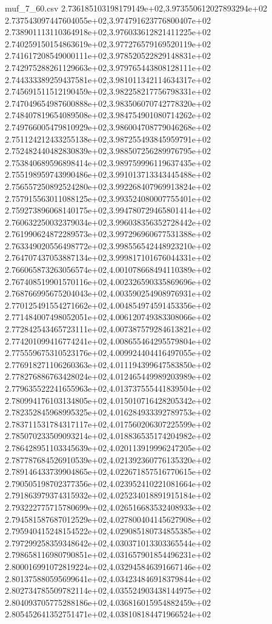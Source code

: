 \begin{filecontents*}{muf_7_60.csv}
2.736185103198179149e+02,3.973550612027893294e+02
2.737543097447604055e+02,3.974791623776800407e+02
2.738901113110364918e+02,3.976033612821411225e+02
2.740259150154863619e+02,3.977276579169520119e+02
2.741617208549000111e+02,3.978520522829148831e+02
2.742975288261129663e+02,3.979765443808128111e+02
2.744333389259437581e+02,3.981011342114634317e+02
2.745691511512190459e+02,3.982258217756798331e+02
2.747049654987600888e+02,3.983506070742778320e+02
2.748407819654089508e+02,3.984754901080714262e+02
2.749766005479810929e+02,3.986004708779046268e+02
2.751124212433255138e+02,3.987255493845959791e+02
2.752482440482830839e+02,3.988507256289976795e+02
2.753840689596898414e+02,3.989759996119637435e+02
2.755198959743990486e+02,3.991013713343445488e+02
2.756557250892524280e+02,3.992268407969913824e+02
2.757915563011088125e+02,3.993524080007755401e+02
2.759273896068140175e+02,3.994780729465801414e+02
2.760632250032379034e+02,3.996038356352728442e+02
2.761990624872289573e+02,3.997296960677531388e+02
2.763349020556498772e+02,3.998556542448923210e+02
2.764707437053887134e+02,3.999817101676044331e+02
2.766065873263056574e+02,4.001078668494110389e+02
2.767408519901570116e+02,4.002326590335869696e+02
2.768766995675204043e+02,4.003590254908976931e+02
2.770125491554271662e+02,4.004854974591453356e+02
2.771484007498052051e+02,4.006120749383308066e+02
2.772842543465723111e+02,4.007387579284613821e+02
2.774201099416774241e+02,4.008655464295579804e+02
2.775559675310523176e+02,4.009924404416497055e+02
2.776918271106260363e+02,4.011194399647583850e+02
2.778276886763428024e+02,4.012465449989203989e+02
2.779635522241655963e+02,4.013737555441839504e+02
2.780994176103134805e+02,4.015010716428205342e+02
2.782352845968995325e+02,4.016284933392789753e+02
2.783711531784317117e+02,4.017560206307225599e+02
2.785070233509093214e+02,4.018836535174204982e+02
2.786428951103345639e+02,4.020113919996247205e+02
2.787787684526910539e+02,4.021392360776135320e+02
2.789146433739904865e+02,4.022671857516770615e+02
2.790505198702377356e+02,4.023952410221081664e+02
2.791863979374315932e+02,4.025234018891915184e+02
2.793222775715780699e+02,4.026516683532408933e+02
2.794581587687012529e+02,4.027800404145627908e+02
2.795940415248154522e+02,4.029085180734855385e+02
2.797299258359348642e+02,4.030371013303365544e+02
2.798658116980790851e+02,4.031657901854496231e+02
2.800016991072819224e+02,4.032945846391667146e+02
2.801375880595699641e+02,4.034234846918379844e+02
2.802734785509782114e+02,4.035524903438144975e+02
2.804093705775288186e+02,4.036816015954882459e+02
2.805452641352751471e+02,4.038108184471966524e+02

\end{filecontents*}
